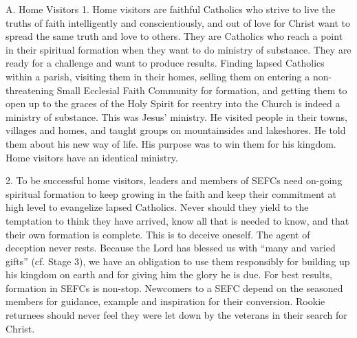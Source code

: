 \documentclass[oneside]{book}
\begin{document}
A. Home Visitors
1. Home visitors are faithful Catholics who strive to live the truths of faith
intelligently and conscientiously, and out of love for Christ want to spread the
same truth and love to others. They are Catholics who reach a point in their
spiritual formation when they want to do ministry of substance. They are ready
for a challenge and want to produce results. Finding lapsed Catholics within a
parish, visiting them in their homes, selling them on entering a non-threatening
Small Ecclesial Faith Community for formation, and getting them to open up to
the graces of the Holy Spirit for reentry into the Church is indeed a ministry
of substance. This was Jesus' ministry. He visited people in their towns,
villages and homes, and taught groups on mountainsides and lakeshores. He told
them about his new way of life. His purpose was to win them for his
kingdom. Home visitors have an identical ministry.

2. To be successful home visitors, leaders and members of SEFCs need on-going
spiritual formation to keep growing in the faith and keep their commitment at
high level to evangelize lapsed Catholics. Never should they yield to the
temptation to think they have arrived, know all that is needed to know, and that
their own formation is complete. This is to deceive oneself. The agent of
deception never rests. Because the Lord has blessed us with ``many and varied
gifts'' (cf. Stage 3), we have an obligation to use them responsibly for
building up his kingdom on earth and for giving him the glory he is due. For
best results, formation in SEFCs is non-stop. Newcomers to a SEFC depend on the
seasoned members for guidance, example and inspiration for their
conversion. Rookie returnees should never feel they were let down by the
veterans in their search for Christ.
\end{document}
